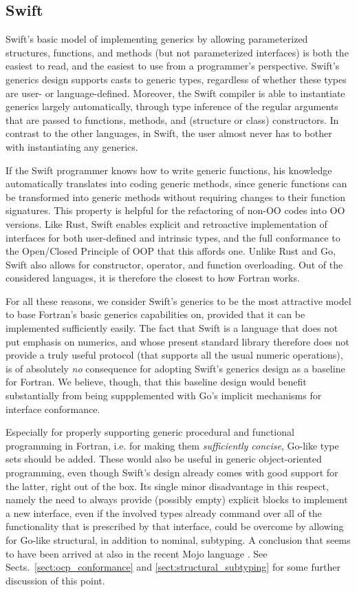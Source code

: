 \documentclass[11pt,oneside]{report}
\newcommand{\code}[1]{{\selectfont\ttfamily{#1}}}
\begin{document}
\subsection{Swift}

Swift's basic model of implementing generics by allowing parameterized
structures, functions, and methods (but not parameterized interfaces)
is both the easiest to read, and the easiest to use from a
programmer's perspective. Swift's generics design supports casts to
generic types, regardless of whether these types are user- or
language-defined. Moreover, the Swift compiler is able to instantiate
generics largely automatically, through type inference of the regular
arguments that are passed to functions, methods, and (structure or
class) constructors. In contrast to the other languages, in Swift, the
user almost never has to bother with instantiating any generics.

If the Swift programmer knows how to write generic functions, his
knowledge automatically translates into coding generic methods, since
generic functions can be transformed into generic methods without
requiring changes to their function signatures. This property is
helpful for the refactoring of non-OO codes into OO versions. Like
Rust, Swift enables explicit and retroactive implementation of
interfaces for both user-defined and intrinsic types, and the full
conformance to the Open/Closed Principle of OOP that this affords
one. Unlike Rust and Go, Swift also allows for constructor, operator,
and function overloading. Out of the considered languages, it is
therefore the closest to how Fortran works.

For all these reasons, we consider Swift's generics to be the most
attractive model to base Fortran's basic generics capabilities on,
provided that it can be implemented sufficiently easily. The fact that
Swift is a language that does not put emphasis on numerics, and whose
present standard library therefore does not provide a truly useful
\code{Numeric} protocol (that supports all the usual numeric
operations), is of absolutely \emph{no} consequence for adopting
Swift's generics design as a baseline for Fortran. We believe, though,
that this baseline design would benefit substantially from being
suppplemented with Go's implicit mechanisms for interface conformance.

Especially for properly supporting generic procedural and functional
programming in Fortran, i.e. for making them \emph{sufficiently
concise}, Go-like type sets should be added. These would also be
useful in generic object-oriented programming, even though Swift's
design already comes with good support for the latter, right out of
the box. Its single minor disadvantage in this respect, namely the
need to always provide (possibly empty) explicit \code{extension}
blocks to implement a new interface, even if the involved types already
command over all of the functionality that is prescribed by that
interface, could be overcome by allowing for Go-like structural, in
addition to nominal, subtyping. A conclusion that seems to have been
arrived at also in the recent Mojo language \cite{MojoRef}. See
Sects.~\ref{sect:ocp_conformance} and \ref{sect:structural_subtyping}
for some further discussion of this point.
\end{document}
